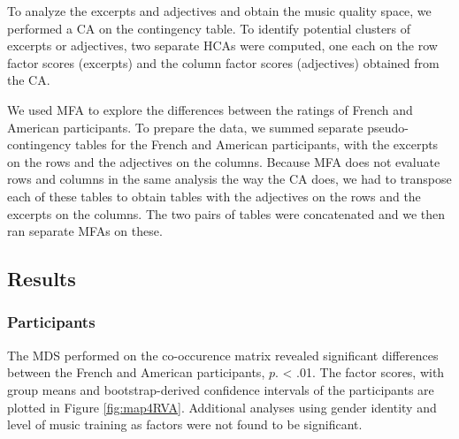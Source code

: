 \documentclass[
  english,
  man,floatsintext]{apa6}
\begin{document}
To analyze the excerpts and adjectives and obtain the music quality space, we performed a CA on the contingency table. To identify potential clusters of excerpts or adjectives, two separate HCAs were computed, one each on the row factor scores (excerpts) and the column factor scores (adjectives) obtained from the CA.

We used MFA to explore the differences between the ratings of French and American participants. To prepare the data, we summed separate pseudo-contingency tables for the French and American participants, with the excerpts on the rows and the adjectives on the columns. Because MFA does not evaluate rows and columns in the same analysis the way the CA does, we had to transpose each of these tables to obtain tables with the adjectives on the rows and the excerpts on the columns. The two pairs of tables were concatenated and we then ran separate MFAs on these.

\hypertarget{results-1}{%
\subsection{Results}\label{results-1}}

\hypertarget{participants-3}{%
\subsubsection{Participants}\label{participants-3}}


The MDS performed on the co-occurence matrix revealed significant differences between the French and American participants, \(\textit{p}\). \textless{} .01. The factor scores, with group means and bootstrap-derived confidence intervals of the participants are plotted in Figure \ref{fig:map4RVA}. Additional analyses using gender identity and level of music training as factors were not found to be significant.
\end{document}
